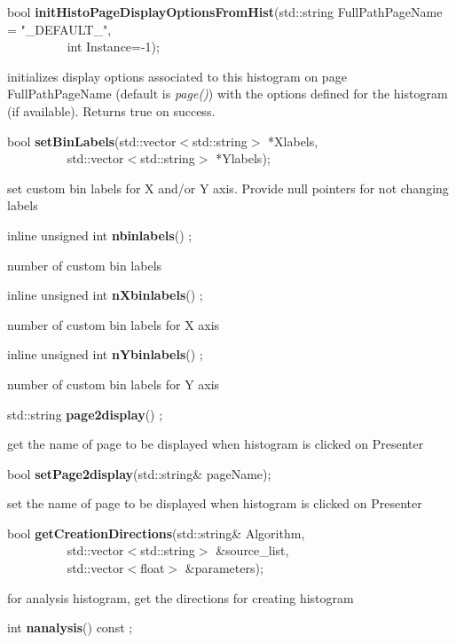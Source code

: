 \item    bool {\bf initHistoPageDisplayOptionsFromHist}(std::string FullPathPageName = "\_DEFAULT\_",\\\mbox{}~~~~~~~~~
					   int Instance=-1);

 initializes display options associated to this histogram on page
 FullPathPageName (default is {\it page()}) with the
 options defined for the histogram (if available). Returns true on
 success.


\item    bool {\bf setBinLabels}(std::vector$<$std::string$>$ *Xlabels,\\\mbox{}~~~~~~~~~ 
                    std::vector$<$std::string$>$ *Ylabels);

 set custom bin labels for X and/or Y axis. Provide null pointers for not changing labels


\item    inline unsigned int {\bf nbinlabels}() ;

 number of custom bin labels


\item    inline unsigned int {\bf nXbinlabels}() ;

 number of custom bin labels for X axis


\item    inline unsigned int {\bf nYbinlabels}() ;

 number of custom bin labels for Y axis


\item    std::string {\bf page2display}() ;

 get the name of page to be displayed when histogram is clicked on Presenter


\item    bool {\bf setPage2display}(std::string\& pageName);


 set the name of page to be displayed when histogram is clicked on Presenter


\item    bool {\bf getCreationDirections}(std::string\& Algorithm,\\\mbox{}~~~~~~~~~
			     std::vector$<$std::string$>$ \&source\_list,\\\mbox{}~~~~~~~~~
			     std::vector$<$float$>$ \&parameters);

 for analysis histogram, get the directions for creating histogram


\item    int {\bf nanalysis}() const ;

